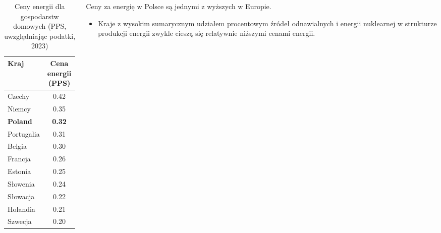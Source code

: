 \begin{columns}[T]
    \begin{column}{0.6\textwidth}
        \begin{table}[h]
            \footnotesize
            \begin{tabular}{lc}
                \toprule
                \textbf{Kraj} & \textbf{Cena energii (PPS)} \\
                \midrule
                Czechy & 0.42 \\
                Niemcy & 0.35 \\
                \textcolor{renewable}{\textbf{Poland}} & \textcolor{renewable}{\textbf{0.32}} \\
                Portugalia & 0.31 \\
                Belgia & 0.30 \\
                Francja & 0.26 \\
                Estonia & 0.25 \\
                Słowenia & 0.24 \\
                \rowcolor{green!10}
                Słowacja & 0.22 \\
                \rowcolor{green!10}
                Holandia & 0.21 \\
                \rowcolor{green!10}
                Szwecja & 0.20 \\
                \bottomrule
            \end{tabular}
                    \vspace{-0.1em}
            \caption{Ceny energii dla gospodarstw domowych (PPS, uwzględniając podatki, 2023)}
        \end{table}
    \end{column}

    \begin{column}{0.4\textwidth}
        \vspace{-2.2em}
        \begin{tcolorbox}[colback=purple!10,colframe=purple!50!black,title=Wniosek kluczowy]
            Ceny za energię w Polsce są jednymi z wyższych w Europie.
        \end{tcolorbox}
        \vspace{-0em}
        \begin{itemize}
            \item \small Kraje z wysokim sumarycznym udziałem procentowym źródeł odnawialnych i energii nuklearnej w strukturze produkcji energii zwykle cieszą się relatywnie niższymi cenami energii.
        \end{itemize}
    \end{column}
\end{columns}
